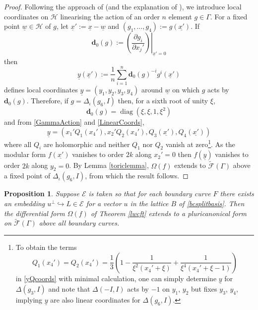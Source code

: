 \documentclass[12pt, a4paper]{article}
\newtheorem{proposition}[thm]{Proposition}
\newcommand{\ec}{\mathcal{E}}
\newcommand{\fc}{\mathcal{F}}
\newcommand{\hc}{\mathcal{H}}
\newcommand{\opn}{\operatorname}
\begin{document}
\begin{proof}
  Following the approach of \cite{Cartan} (and the explanation of \cite[p.331]{HuybrechtsK3}), we introduce local coordinates on $\hc$ linearising the action of an order $n$ element $g \in \Gamma$.  
  For a fixed point $\underline{w} \in \hc$ of $g$, let $\underline{x}' := \underline{x} - \underline{w}$ and $(g_1, \ldots, g_4):=g(\underline{x'})$.
  If  
  \[
  \textbf{d}_0(g) :=  \left. \left ( \frac{\partial g_i}{\partial x_j'} \right ) \right \vert_{\underline{x}'=0}
  \]
  then
  \[
  \underline{y}(\underline{x}'):=\frac{1}{n} \sum_{i=1}^n
 \textbf{d}_0(g)^{-i} g^i(\underline{x}') 
 \]
 defines local coordinates $\underline{y}=(y_1, y_2, y_3, y_4)$ around $\underline{w}$ on which $g$ acts by $\textbf{d}_0(g)$.
 Therefore, if $g=\Delta_{\iota}(g_6, I)$ then, for a sixth root of unity $\xi$, 
 \begin{equation}\label{LinearCoords}
 \textbf{d}_0(g) = \opn{diag}(\xi, \xi, 1, \xi^2)
  \end{equation}
  and from \eqref{GammaAction} and \eqref{LinearCoords}, 
 \begin{equation}\label{yQcoords}
 \underline{y} = \left ( x_1' Q_1(x_4'), x_2' Q_2(x_4'),  Q_3(\underline{x'}), Q_4(\underline{x'})\right )
 \end{equation}
 where all $Q_i$ are holomorphic and neither $Q_1$ nor $Q_2$ vanish at zero\footnote{
 To obtain the terms
 \[
 Q_1(x_4')=Q_2(x_4')=\frac{1}{3}\left(1-\frac{1}{\xi^2(x_4' + \xi)} + \frac{1}{\xi^4(x_4'+\xi-1)}\right)
 \]
 in \eqref{yQcoords} with minimal calculation, one can simply determine $\underline{y}$ for $\Delta(g_3, I)$ and note that $\Delta(-I, I)$ acts by $-1$ on $y_1$, $y_2$ but fixes $y_3$, $y_4$, implying $\underline{y}$ are also linear coordinates for $\Delta(g_6, I)$.}.
 As the modular form $f(\underline{x'})$ vanishes to order $2k$ along $x_2'=0$ then $f(\underline{y})$ vanishes to order $2k$ along $y_2=0$.
 By Lemma \ref{toriclemma}, $\Omega(f)$ extends to $\widetilde{\fc}(\Gamma)$ above a fixed point of $\Delta_{\iota}(g_6, I)$, from which the result follows. 
\end{proof}
\begin{proposition}\label{bcextprop}
  Suppose $\ec$ is taken so that for each
  boundary curve $F$ there exists an embedding $u^{\perp} \hookrightarrow L \in \ec$ for a vector $u$ in the lattice $B$ of \eqref{bcsplitbasis}.
Then the differential form $\Omega(f)$ of Theorem \ref{lwcft} extends to a pluricanonical form on $\widetilde{\fc}(\Gamma)$  above all boundary curves.
\end{proposition}
\end{document}
